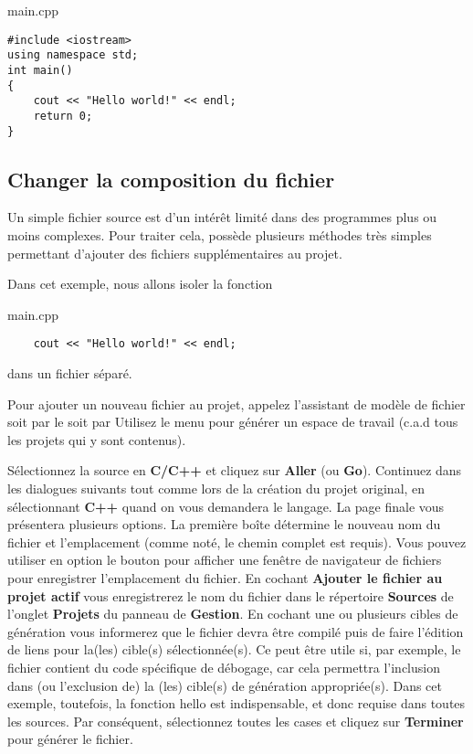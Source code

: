 main.cpp 
\begin{lstlisting}
#include <iostream>
using namespace std;
int main()
{
    cout << "Hello world!" << endl;
    return 0;
}
\end{lstlisting}

\subsection{Changer la composition du fichier}

Un simple fichier source est d'un intérêt limité dans des programmes plus ou moins complexes. Pour traiter cela, \codeblocks possède plusieurs méthodes très simples permettant d'ajouter des fichiers supplémentaires au projet.


Dans cet exemple, nous allons isoler la fonction

main.cpp
\begin{lstlisting}
    cout << "Hello world!" << endl;
\end{lstlisting}

dans un fichier séparé.


Pour ajouter un nouveau fichier au projet, appelez l'assistant de modèle de fichier soit par le  soit par  
Utilisez le menu  pour générer un espace de travail (c.a.d tous les projets qui y sont contenus). 

Sélectionnez la source en \textbf{C/C++} et cliquez sur \textbf{Aller} (ou \textbf{Go}). Continuez dans les dialogues suivants tout comme lors de la création du projet original, en sélectionnant \textbf{C++} quand on vous demandera le langage. La page finale vous présentera plusieurs options. La première boîte détermine le nouveau nom du fichier et l'emplacement (comme noté, le chemin complet est requis). Vous pouvez utiliser en option le bouton  pour afficher une fenêtre de navigateur de fichiers pour enregistrer l'emplacement du fichier. En cochant \textbf{Ajouter le fichier au projet actif} vous enregistrerez le nom du fichier dans le répertoire \textbf{Sources} de l'onglet \textbf{Projets} du panneau de \textbf{Gestion}. En cochant une ou plusieurs cibles de génération vous informerez \codeblocks que le fichier devra être compilé puis de faire l'édition de liens pour la(les) cible(s) sélectionnée(s). Ce peut être utile si, par exemple, le fichier contient du code spécifique de débogage, car cela permettra l'inclusion dans (ou l'exclusion de) la (les) cible(s) de génération appropriée(s). Dans cet exemple, toutefois, la fonction hello est indispensable, et donc requise dans toutes les sources. Par conséquent, sélectionnez toutes les cases et cliquez sur \textbf{Terminer} pour générer le fichier.

